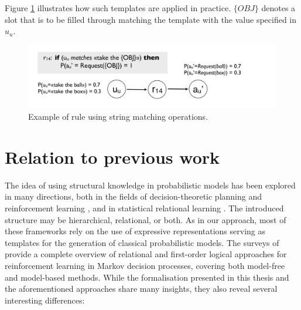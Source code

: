 Figure \ref{fig:stringmanip} illustrates how such templates are applied in practice.  $\{\mathit{OBJ}\}$ denotes a slot that is to be filled through matching the template with the value specified in $u_u$. 
\begin{figure}[ht]
\centering
\includegraphics[scale=0.25]{imgs/stringmanip.pdf}
\caption{Example of rule using string matching operations.}
\label{fig:stringmanip}
\end{figure}

\section{Relation to previous work}
\label{sec:relatedwork}

The idea of using structural knowledge in probabilistic models has been explored in many directions, both in the fields of decision-theoretic planning and reinforcement learning \citep{Hauskrecht98,Pineau:2004,KerstingR04,lang10jair,Otterlo2012}, and in statistical relational learning \citep{Jaeger01,Richardson:2006,getoor:srlbook07}.  The introduced structure may be hierarchical, relational, or both. As in our approach, most of these frameworks rely on the use of expressive representations serving as templates for the generation of classical probabilistic models.  The surveys of \cite{Otterlo2006,Otterlo2012} provide a complete overview of relational and first-order logical approaches for reinforcement learning in Markov decision processes, covering both model-free and model-based methods.  While the formalisation presented in this thesis and the aforementioned approaches share many insights, they also reveal several interesting differences: 

